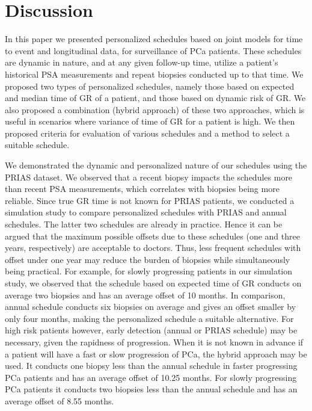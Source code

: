 
\section{Discussion}
\label{sec: discussion}
In this paper we presented personalized schedules based on joint models for time to event and longitudinal data, for surveillance of PCa patients. These schedules are dynamic in nature, and at any given follow-up time, utilize a patient's historical PSA measurements and repeat biopsies conducted up to that time. We proposed two types of personalized schedules, namely those based on expected and median time of GR of a patient, and those based on dynamic risk of GR. We also proposed a combination (hybrid approach) of these two approaches, which is useful in scenarios where variance of time of GR for a patient is high. We then proposed criteria for evaluation of various schedules and a method to select a suitable schedule.

We demonstrated the dynamic and personalized nature of our schedules using the PRIAS dataset. We observed that a recent biopsy impacts the schedules more than recent PSA measurements, which correlates with biopsies being more reliable. Since true GR time is not known for PRIAS patients, we conducted a simulation study to compare personalized schedules with PRIAS and annual schedules. The latter two schedules are already in practice. Hence it can be argued that the maximum possible offsets due to these schedules (one and three years, respectively) are acceptable to doctors. Thus, less frequent schedules with offset under one year may reduce the burden of biopsies while simultaneously being practical. For example, for slowly progressing patients in our simulation study, we observed that the schedule based on expected time of GR conducts on average two biopsies and has an average offset of 10 months. In comparison, annual schedule conducts six biopsies on average and gives an offset smaller by only four months, making the personalized schedule a suitable alternative. For high risk patients however, early detection (annual or PRIAS schedule) may be necessary, given the rapidness of progression. When it is not known in advance if a patient will have a fast or slow progression of PCa, the hybrid approach may be used. It conducts one biopsy less than the annual schedule in faster progressing PCa patients and has an average offset of 10.25 months. For slowly progressing PCa patients it conducts two biopsies less than the annual schedule and has an average offset of 8.55 months.

